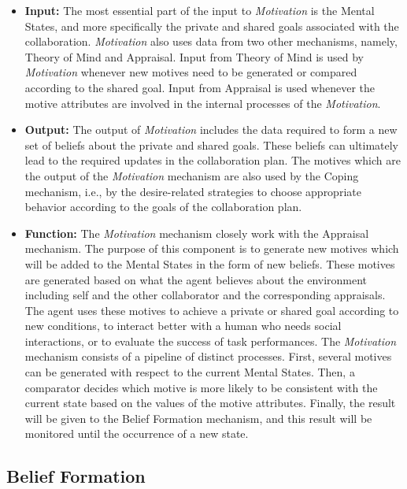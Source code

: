 \documentclass[12pt]{report}
\begin{document}
\begin{itemize}
  \item \textbf{Input:} The most essential part of the input to
  \textit{Motivation} is the Mental States, and more specifically the private
  and shared goals associated with the collaboration. \textit{Motivation} also
  uses data from two other mechanisms, namely, Theory of Mind and Appraisal.
  Input from Theory of Mind is used by \textit{Motivation} whenever new motives
  need to be generated or compared according to the shared goal. Input from
  Appraisal is used whenever the motive attributes are involved in the internal
  processes of the \textit{Motivation}.
  
  \item \textbf{Output:} The output of \textit{Motivation} includes the data
  required to form a new set of beliefs about the private and shared goals.
  These beliefs can ultimately lead to the required updates in the collaboration
  plan. The motives which are the output of the \textit{Motivation} mechanism
  are also used by the Coping mechanism, i.e., by the desire-related strategies
  to choose appropriate behavior according to the goals of the collaboration
  plan.
  
  \item \textbf{Function:} The \textit{Motivation} mechanism closely work with
  the Appraisal mechanism. The purpose of this component is to generate new
  motives which will be added to the Mental States in the form of new beliefs.
  These motives are generated based on what the agent believes about the
  environment including self and the other collaborator and the corresponding
  appraisals. The agent uses these motives to achieve a private or shared goal
  according to new conditions, to interact better with a human who needs social
  interactions, or to evaluate the success of task performances. The
  \textit{Motivation} mechanism consists of a pipeline of distinct processes.
  First, several motives can be generated with respect to the current Mental
  States. Then, a comparator decides which motive is more likely to be
  consistent with the current state based on the values of the motive
  attributes. Finally, the result will be given to the Belief Formation
  mechanism, and this result will be monitored until the occurrence of a new
  state.
\end{itemize}

\subsection{Belief Formation}
\end{document}
